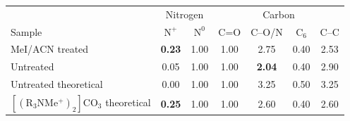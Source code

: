 \documentclass[border=2pt]{standalone}
\makeatletter
\renewenvironment{table}[1][]{%
    \begin{minipage}{\textwidth}\centering
    \def\@captype{table}%
}{%
    \end{minipage}%
}
\makeatother
\begin{document}

\begin{table}[htbp]
\centering
\caption{Normalized high-resolution XPS peak ratios. Peak areas are normalized to the neutral nitrogen (400.0 eV) component. The C$_6$ carbon is constrained to represent the C$_6$ carbon of the aromatic ring, as was done in Appendix~\ref{app:TDICED_FTIR}\cite{werner2026}}
\label{tab:XPSHiRes}

\renewcommand{\arraystretch}{1.25}

\begin{tabular}{lcccccc}
\toprule
&
\multicolumn{2}{c}{Nitrogen} &
\multicolumn{4}{c}{Carbon} \\
\cmidrule(lr){2-3}
\cmidrule(lr){4-7}

Sample &
$\mathrm{N^+}$ &
$\mathrm{N^0}$ &
C=O &
C--O/N &
C$_6$ &
C--C \\
\midrule

MeI/ACN treated &
\textbf{0.23} &
1.00 &
1.00 &
2.75 &
0.40 &
2.53 \\

Untreated &
0.05 &
1.00 &
1.00 &
\textbf{2.04} &
0.40 &
2.90 \\

Untreated theoretical &
0.00 &
1.00 &
1.00 &
3.25 &
0.50 &
3.25 \\

$[(\mathrm{R_3NMe^+})_2]\mathrm{CO_3}$ theoretical &
\textbf{0.25} &
1.00 &
1.00 &
2.60 &
0.40 &
2.60 \\
\bottomrule
\end{tabular}
\end{table}
\end{document}
